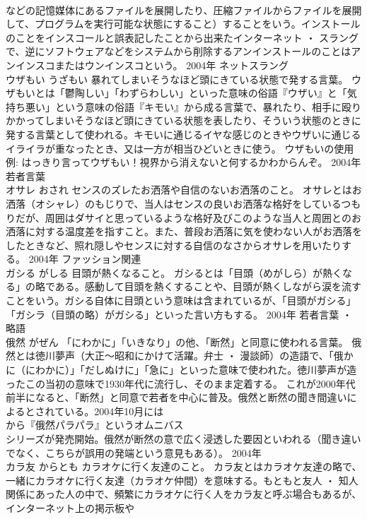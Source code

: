 \documentclass[8pt]{extreport}
\begin{document}
\begin{CJK}{UTF8}{min}
\\	などの記憶媒体にあるファイルを展開したり、圧縮ファイルからファイルを展開して、プログラムを実行可能な状態にすること）することをいう。インストールのことをインスコールと誤表記したことから出来たインターネット ・ スラングで、逆にソフトウェアなどをシステムから削除するアンインストールのことはアンインスコまたはウンインスコという。	2004年	ネットスラング	
\\	ウザもい	うざもい	暴れてしまいそうなほど頭にきている状態で発する言葉。	ウザもいとは「鬱陶しい」「わずらわしい」といった意味の俗語『ウザい』と「気持ち悪い」という意味の俗語『キモい』から成る言葉で、暴れたり、相手に殴りかかってしまいそうなほど頭にきている状態を表したり、そういう状態のときに発する言葉として使われる。キモいに通じるイヤな感じのときやウザいに通じるイライラが重なったとき、又は一方が相当ひどいときに使う。 ウザもいの使用例: はっきり言ってウザもい！視界から消えないと何するかわからんぞ。	2004年	若者言葉	
\\	オサレ	おされ	センスのズレたお洒落や自信のないお洒落のこと。	オサレとはお洒落（オシャレ）のもじりで、当人はセンスの良いお洒落な格好をしているつもりだが、周囲はダサイと思っているような格好及びこのような当人と周囲とのお洒落に対する温度差を指すこと。また、普段お洒落に気を使わない人がお洒落をしたときなど、照れ隠しやセンスに対する自信のなさからオサレを用いたりする。	2004年	ファッション関連	
\\	ガシる	がしる	目頭が熱くなること。	ガシるとは「目頭（めがしら）が熱くなる」の略である。感動して目頭を熱くすることや、目頭が熱くしながら涙を流すことをいう。ガシる自体に目頭という意味は含まれているが、「目頭がガシる」「ガシラ（目頭の略）がガシる」といった言い方もする。	2004年	若者言葉 ・ 略語	
\\	俄然	がぜん	「にわかに」「いきなり」の他、「断然」と同意に使われる言葉。	俄然とは徳川夢声（大正～昭和にかけて活躍。弁士 ・ 漫談師）の造語で、「俄かに（にわかに）」「だしぬけに」「急に」といった意味で使われた。徳川夢声が造ったこの当初の意味で1930年代に流行し、そのまま定着する。 これが2000年代前半になると、「断然」と同意で若者を中心に普及。俄然と断然の聞き間違いによるとされている。2004年10月には
\\	から『俄然パラパラ』というオムニバス
\\	シリーズが発売開始。俄然が断然の意で広く浸透した要因といわれる（聞き違いでなく、こちらが誤用の発端という意見もある）。	2004年	
\\	カラ友	からとも	カラオケに行く友達のこと。	カラ友とはカラオケ友達の略で、一緒にカラオケに行く友達（カラオケ仲間）を意味する。もともと友人 ・ 知人関係にあった人の中で、頻繁にカラオケに行く人をカラ友と呼ぶ場合もあるが、インターネット上の掲示板や

\end{CJK}
\end{document}
